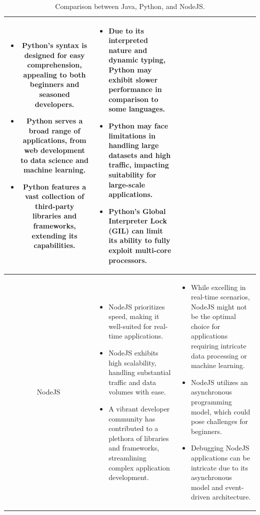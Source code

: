 \begin{table}[H]
\begin{tabular}{| c | p{} | p{} |}
\begin{itemize}[leftmargin=*,topsep=0pt,partopsep=0pt,parsep=0pt]
                        \item Python's syntax is designed for easy comprehension, appealing to both beginners and seasoned developers.
                        \item Python serves a broad range of applications, from web development to data science and machine learning.
                        \item Python features a vast collection of third-party libraries and frameworks, extending its capabilities.
                    \end{itemize}
                &   \begin{itemize}[leftmargin=*,topsep=0pt,partopsep=0pt,parsep=0pt]
                        \item Due to its interpreted nature and dynamic typing, Python may exhibit slower performance in comparison to some languages.
                        \item Python may face limitations in handling large datasets and high traffic, impacting suitability for large-scale applications.
                        \item Python's Global Interpreter Lock (GIL) can limit its ability to fully exploit multi-core processors.
                    \end{itemize} \\ \hline
        \multirow{8}{*}{NodeJS}
                    &   \begin{itemize}[leftmargin=*,topsep=0pt,partopsep=0pt,parsep=0pt]
                            \item NodeJS prioritizes speed, making it well-suited for real-time applications.
                            \item NodeJS exhibits high scalability, handling substantial traffic and data volumes with ease.
                            \item A vibrant developer community has contributed to a plethora of libraries and frameworks, streamlining complex application development.
                        \end{itemize}
                    &   \begin{itemize}[leftmargin=*,topsep=0pt,partopsep=0pt,parsep=0pt]
                            \item While excelling in real-time scenarios, NodeJS might not be the optimal choice for applications requiring intricate data processing or machine learning.
                            \item NodeJS utilizes an asynchronous programming model, which could pose challenges for beginners.
                            \item Debugging NodeJS applications can be intricate due to its asynchronous model and event-driven architecture.
                    \end{itemize} \\ \hline
    \end{tabular}
    \caption{Comparison between Java, Python, and NodeJS.}
\end{table}

